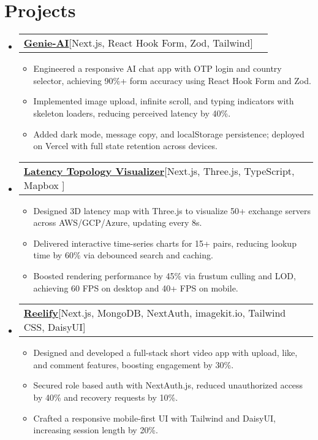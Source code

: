 \documentclass[letterpaper,10pt]{article}
\makeatletter
\newcommand{\resumeItem}[1]{
    \item\small{
      {#1 \vspace{-2pt}}
    }
  }
\newcommand{\resumeProjectHeading}[2]{
      \item
      \begin{tabular*}{0.97\textwidth}{l@{\extracolsep{\fill}}r}
        \small#1 & #2 \\
      \end{tabular*}\vspace{-7pt}
  }
\newcommand{\resumeSubHeadingListStart}{\begin{itemize}[leftmargin=0.15in, label={}]}
\newcommand{\resumeSubHeadingListEnd}{\end{itemize}}
\newcommand{\resumeItemListStart}{\begin{itemize}}
\newcommand{\resumeItemListEnd}{\end{itemize}\vspace{-5pt}}
\makeatother
\begin{document}



\section{Projects}

\resumeSubHeadingListStart
\resumeProjectHeading
{\textbf{\href{https://github.com/shanutiwari1010/genie-ai}{Genie-AI}\hspace{5pt}}{{[Next.js, React Hook Form, Zod, Tailwind]}}}{}
\resumeItemListStart
  \resumeItem{Engineered a responsive AI chat app with OTP login and country selector, achieving 90\%+ form accuracy using React Hook Form and Zod.}
  \resumeItem{Implemented image upload, infinite scroll, and typing indicators with skeleton loaders, reducing perceived latency by 40\%.}
  \resumeItem{Added dark mode, message copy, and localStorage persistence; deployed on Vercel with full state retention across devices.}
\resumeItemListEnd
\resumeSubHeadingListEnd

\resumeSubHeadingListStart
\resumeProjectHeading
{\textbf{\href{https://github.com/shanutiwari1010/latency-topology-visualizer}{Latency Topology Visualizer}\hspace{5pt}}{{[Next.js, Three.js, TypeScript, Mapbox ]}}}{}
\resumeItemListStart
  \resumeItem{Designed 3D latency map with Three.js to visualize 50+ exchange servers across AWS/GCP/Azure, updating every 8s.}
  \resumeItem{Delivered interactive time-series charts for 15+ pairs, reducing lookup time by 60\% via debounced search and caching.}
  \resumeItem{Boosted rendering performance by 45\% via frustum culling and LOD, achieving 60 FPS on desktop and 40+ FPS on mobile.
}
\resumeItemListEnd
\resumeSubHeadingListEnd

\resumeSubHeadingListStart
\resumeProjectHeading
{\textbf{\href{https://github.com/shanutiwari1010/reelify}
{Reelify}\hspace{5pt}}{[Next.js, MongoDB, NextAuth, imagekit.io, Tailwind CSS, DaisyUI]}}{}

\resumeItemListStart
  \resumeItem{Designed and developed a full-stack short video app with upload, like, and comment features, boosting engagement by 30\%.}
  \resumeItem{Secured role based auth with NextAuth.js, reduced unauthorized access by 40\% and recovery requests by 10\%.}
  \resumeItem{Crafted a responsive mobile-first UI with Tailwind and DaisyUI, increasing session length by 20\%.}
\resumeItemListEnd
\resumeSubHeadingListEnd
\end{document}
